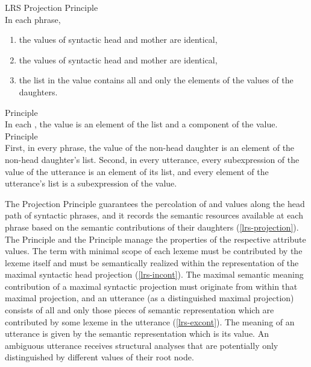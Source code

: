 \documentclass[output=paper]{langsci/langscibook}
\begin{document}
\begin{exe}
  \ex\label{lrs-essent-principles}
  \begin{xlist}
    \ex\label{lrs-projection} LRS Projection Principle\\
    In each phrase,
    \begin{enumerate}
    \item the  values of syntactic head and mother are identical,
    \item the  values of syntactic head and mother are identical,
    \item the list in the  value contains all and only the elements
    of the  values of the daughters.
    \end{enumerate}
    \ex\label{lrs-incont}  Principle\\
    In each , the  value is an element of the
     list and a component of the  value.
    \ex\label{lrs-excont}  Principle\\
    First, in every phrase, the  value of the non-head daughter
    is an element of the non-head daughter's  list. Second, in
    every utterance, every subexpression of the  value of the
    utterance is an element of its  list, and every element of
    the utterance's  list is a subexpression of the 
    value.
  \end{xlist}
\end{exe}

The Projection Principle guarantees the percolation of  and
 values along the head path of syntactic phrases, and it records
the semantic resources available at each phrase based on the semantic
contributions of their daughters (\ref{lrs-projection}). The  Principle and the  Principle manage the properties of the respective attribute values. The term with minimal scope of each lexeme must be contributed by the lexeme itself and must be semantically realized within the representation of the maximal syntactic head projection (\ref{lrs-incont}). The maximal semantic meaning contribution of a maximal syntactic projection must originate from within that maximal projection, and an utterance (as a distinguished maximal projection) consists of all and only those pieces of semantic representation which are contributed by some lexeme in the utterance (\ref{lrs-excont}). The meaning of an utterance is given by the semantic representation which is its  value. An ambiguous utterance receives structural analyses that are potentially only distinguished by different  values of their root node.
\end{document}

